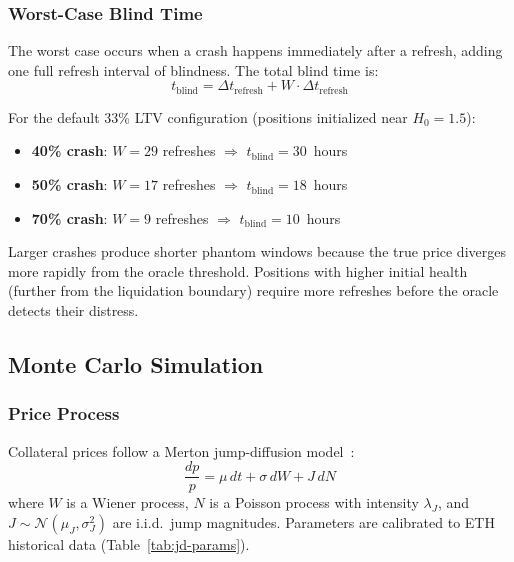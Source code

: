 \documentclass[10pt,a4paper,twocolumn]{article}
\theoremstyle{definition}
\theoremstyle{plain}
\theoremstyle{remark}
\begin{document}
\subsubsection{Worst-Case Blind Time}
\label{subsec:bd-blind}

The worst case occurs when a crash happens immediately after a refresh, adding one full refresh interval of blindness. The total blind time is:
\begin{equation}
\label{eq:blind-time}
t_{\text{blind}} = \Delta t_{\text{refresh}} + W \cdot \Delta t_{\text{refresh}}
\end{equation}

For the default 33\% LTV configuration (positions initialized near $H_0 = 1.5$):
\begin{itemize}[leftmargin=*]
\item \textbf{40\% crash}: $W = 29$ refreshes $\Rightarrow$ $t_{\text{blind}} = 30$~hours
\item \textbf{50\% crash}: $W = 17$ refreshes $\Rightarrow$ $t_{\text{blind}} = 18$~hours
\item \textbf{70\% crash}: $W = 9$ refreshes $\Rightarrow$ $t_{\text{blind}} = 10$~hours
\end{itemize}

\noindent Larger crashes produce shorter phantom windows because the true price diverges more rapidly from the oracle threshold. Positions with higher initial health (further from the liquidation boundary) require more refreshes before the oracle detects their distress.

\subsection{Monte Carlo Simulation}
\label{sec:bd-montecarlo}

\subsubsection{Price Process}
\label{subsec:bd-price}

Collateral prices follow a Merton jump-diffusion model~\cite{merton1976}:
\begin{equation}
\label{eq:jump-diffusion}
\frac{dp}{p} = \mu\,dt + \sigma\,dW + J\,dN
\end{equation}
where $W$ is a Wiener process, $N$ is a Poisson process with intensity $\lambda_J$, and $J \sim \mathcal{N}(\mu_J, \sigma_J^2)$ are i.i.d.\ jump magnitudes. Parameters are calibrated to ETH historical data (Table~\ref{tab:jd-params}).
\end{document}

